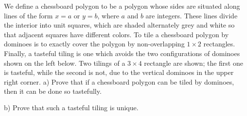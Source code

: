 We define a chessboard polygon to be a polygon whose sides are situated along lines of the form $ x = a$ or $ y = b$,  where $ a$ and $ b$ are integers. These lines divide the interior into unit squares, which are shaded alternately grey and white so that adjacent squares have different colors. To tile a chessboard polygon by dominoes is to exactly cover the polygon by non-overlapping $ 1 \times 2$ rectangles. Finally, a tasteful tiling is one which avoids the two configurations of dominoes shown on the left below. Two tilings of a $ 3 \times 4$ rectangle are shown; the first one is tasteful, while the second is not, due to the vertical dominoes in the upper right corner. a) Prove that if a chessboard polygon can be tiled by dominoes, then it can be done so tastefully.

b) Prove that such a tasteful tiling is unique.